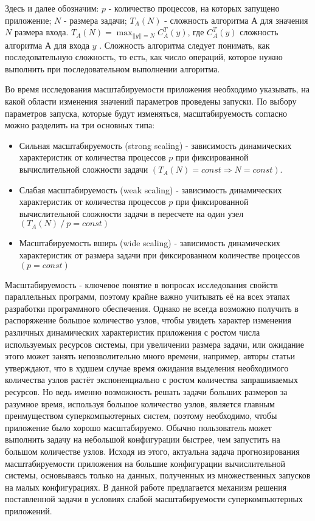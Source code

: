 	Здесь и далее обозначим: \(p\) - количество процессов, на которых запущено приложение; \(N\) - размера задачи; \(T_A(N)\) - сложность алгоритма \(А\) для значения \(N\) размера входа. \(T_A(N) = \max_{||y|| = N} C^T_A(y)\), где \(C^T_A(y)\) сложность алгоритма \(А\) для входа \(y\) \cite{COMPLEXITY}. Сложность алгоритма следует понимать, как последовательную сложность, то есть, как число операций, которое нужно выполнить при последовательном выполнении алгоритма.

	Во время исследования масштабируемости приложения необходимо указывать, на какой области изменения значений параметров проведены запуски. По выбору параметров запуска, которые будут изменяться, масштабируемость согласно \cite{scaling_types} можно разделить на три основных типа:
	\begin{itemize}
		\item Сильная масштабируемость (strong scaling) - зависимость динамических характеристик от количества процессов \(p\) при фиксированной вычислительной сложности задачи \((T_A(N) = const \Rightarrow N = const)\).
		\item Слабая масштабируемость (weak scaling) - зависимость динамических характеристик от количества процессов \(p\) при фиксированной вычислительной сложности задачи в пересчете на один узел \((T_A(N)\:/\:p = const)\)
		\item Масштабируемость вширь (wide scaling) - зависимость динамических характеристик от размера задачи при фиксированном количестве процессов \((p = const)\)
	\end{itemize}

	Масштабируемость - ключевое понятие в вопросах исследования свойств параллельных программ, поэтому крайне важно учитывать её на всех этапах разработки программного обеспечения. Однако не всегда возможно получить в распоряжение большое количество узлов, чтобы увидеть характер изменения различных динамических характеристик приложения с ростом числа используемых ресурсов системы, при увеличении размера задачи, или ожидание этого может занять непозволительно много времени, например, авторы статьи \cite{log_main} утверждают, что в худшем случае время ожидания выделения необходимого количества узлов растёт экспоненциально с ростом количества запрашиваемых ресурсов. Но ведь именно возможность решать задачи больших размеров за разумное время, используя большое количество узлов, является главным преимуществом суперкомпьютерных систем, поэтому необходимо, чтобы приложение было хорошо масштабируемо. Обычно пользователь может выполнить задачу на небольшой конфигурации быстрее, чем запустить на большом количестве узлов. Исходя из этого, актуальна задача прогнозирования масштабируемости приложения на большие конфигурации вычислительной системы, основываясь только на данных, полученных из множественных запусков на малых конфигурациях. В данной работе предлагается механизм решения поставленной задачи в условиях слабой масштабируемости суперкомпьютерных приложений.
\clearpage
